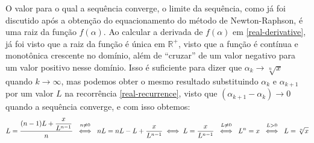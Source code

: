 O valor para o qual a sequência converge, o limite da sequência,
como já foi discutido
após a obtenção do equacionamento do método de Newton-Raphson,
é uma raiz da função $f(\alpha)$.
Ao calcular a derivada de $f(\alpha)$ em \eqref{real-derivative},
já foi visto que a raiz da função é única em $\mathds{R}^+$,
visto que a função é contínua e monotônica crescente no domínio,
além de ``cruzar'' de um valor negativo para um valor positivo
nesse domínio.
Isso é suficiente
para dizer que $\alpha_k \to \sqrt[n]{x}$ quando $k \to \infty$,
mas podemos obter o mesmo resultado
substituindo $\alpha_k$ e $\alpha_{k+1}$ por um valor $L$
na recorrência \eqref{real-recurrence},
visto que $(\alpha_{k+1} - \alpha_k) \to 0$ quando a sequência converge,
e com isso obtemos:
\begin{equation}
    L = \dfrac{(n - 1) L + \dfrac{x}{L^{n-1}}}{n}
  \stackfirst{n \ne 0}{\iff}
    nL = nL - L + \dfrac{x}{L^{n-1}}
  \iff
    L = \dfrac{x}{L^{n-1}}
  \stackfirst{L \ne 0}{\iff}
    L^n = x
  \stackfirst{L > 0}{\iff}
    L = \sqrt[n]{x}
\end{equation}

